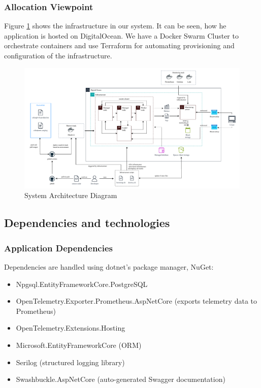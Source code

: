 \subsubsection{Allocation Viewpoint}
Figure \ref{fig:architecture} shows the infrastructure in our system.
It can be seen, how he application is hosted on DigitalOcean. We have a Docker Swarm Cluster to orchestrate containers and use Terraform for automating provisioning and configuration of the infrastructure.


\begin{figure}[H]
    \centering
    \includegraphics[width=1.0\textwidth]{figures/devops-architecture-architecture_v2.pdf}
    \caption{System Architecture Diagram}
    \label{fig:architecture}
\end{figure}

\subsection{Dependencies and technologies}
\subsubsection{Application Dependencies}
Dependencies are handled using dotnet's package manager, NuGet:
\begin{itemize}
    \item Npgsql.EntityFrameworkCore.PostgreSQL 
    \item OpenTelemetry.Exporter.Prometheus.AspNetCore (exports telemetry data to Prometheus)
    \item OpenTelemetry.Extensions.Hosting
    \item Microsoft.EntityFrameworkCore (ORM)
    \item Serilog (structured logging library)
    \item Swashbuckle.AspNetCore (auto-generated Swagger documentation)
\end{itemize}


